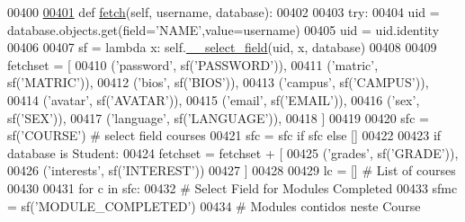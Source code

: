 \begin{DoxyCode}
00400 
\hypertarget{ProfileUnit_8py_source_l00401}{}\hyperlink{classProfile_1_1ProfileUnit_1_1PersProfile_a6786051dcc78f2f481ab6170b47acd7c}{00401}     \textcolor{keyword}{def }\hyperlink{classProfile_1_1ProfileUnit_1_1PersProfile_a6786051dcc78f2f481ab6170b47acd7c}{fetch}(self, username, database):
00402 
00403         \textcolor{keywordflow}{try}:
00404             uid = database.objects.get(field=\textcolor{stringliteral}{'NAME'},value=username)
00405             uid = uid.identity
00406 
00407             sf = \textcolor{keyword}{lambda} x: self.\hyperlink{classProfile_1_1ProfileUnit_1_1PersProfile_abc9c9fc9809b7680f9b3f6a929415692}{\_\_select\_field}(uid, x, database)
00408 
00409             fetchset = [
00410                     (\textcolor{stringliteral}{'password'},    sf(\textcolor{stringliteral}{'PASSWORD'})),
00411                     (\textcolor{stringliteral}{'matric'},      sf(\textcolor{stringliteral}{'MATRIC'})),
00412                     (\textcolor{stringliteral}{'bios'},        sf(\textcolor{stringliteral}{'BIOS'})),
00413                     (\textcolor{stringliteral}{'campus'},      sf(\textcolor{stringliteral}{'CAMPUS'})),
00414                     (\textcolor{stringliteral}{'avatar'},      sf(\textcolor{stringliteral}{'AVATAR'})),
00415                     (\textcolor{stringliteral}{'email'},       sf(\textcolor{stringliteral}{'EMAIL'})),
00416                     (\textcolor{stringliteral}{'sex'},         sf(\textcolor{stringliteral}{'SEX'})),
00417                     (\textcolor{stringliteral}{'language'},    sf(\textcolor{stringliteral}{'LANGUAGE'})),
00418             ]
00419 
00420             sfc = sf(\textcolor{stringliteral}{'COURSE'}) \textcolor{comment}{# select field courses}
00421             sfc = sfc \textcolor{keywordflow}{if} sfc \textcolor{keywordflow}{else} []
00422 
00423             \textcolor{keywordflow}{if} database \textcolor{keywordflow}{is} Student:
00424                 fetchset = fetchset + [     
00425                     (\textcolor{stringliteral}{'grades'},      sf(\textcolor{stringliteral}{'GRADE'})),
00426                     (\textcolor{stringliteral}{'interests'},   sf(\textcolor{stringliteral}{'INTEREST'}))
00427                 ]
00428 
00429                 lc = [] \textcolor{comment}{# List of courses}
00430                 
00431                 \textcolor{keywordflow}{for} c \textcolor{keywordflow}{in} sfc:
00432                     \textcolor{comment}{# Select Field for Modules Completed}
00433                     sfmc = sf(\textcolor{stringliteral}{'MODULE\_COMPLETED'})
00434                     \textcolor{comment}{# Modules contidos neste Course}

\end{DoxyCode}
